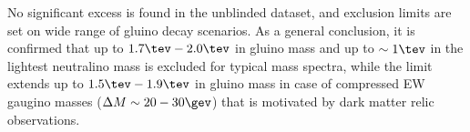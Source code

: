 No significant excess is found in the unblinded dataset, and exclusion limits are set on wide range of gluino decay scenarios. As a general conclusion,
it is confirmed that up to $1.7\tev - 2.0 \tev$ in gluino mass and up to $\sim 1\tev$ in the lightest neutralino mass is excluded for typical mass spectra, 
while the limit extends up to $1.5\tev - 1.9 \tev$ in gluino mass in case of compressed EW gaugino masses ($\Delta M \sim 20-30\gev$) that is motivated by dark matter relic observations.



\clearpage





%
